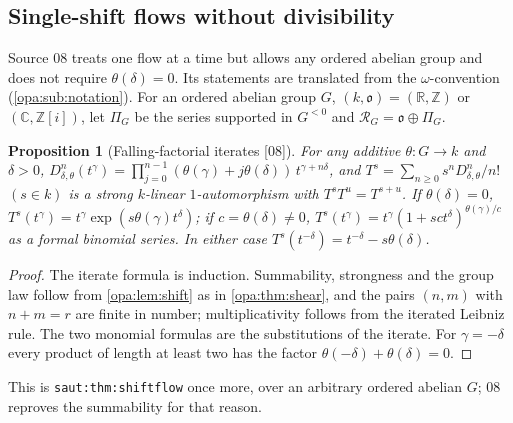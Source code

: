 \documentclass[11pt,oneside]{article}
\numberwithin{equation}{section}
\newtheorem{proposition}[proposition]{Proposition}
\theoremstyle{definition}
\theoremstyle{remark}
\newcommand{\R}{\mathbb R}
\newcommand{\C}{\mathbb C}
\newcommand{\Z}{\mathbb Z}
\newcommand{\oo}{\mathfrak o}
\newcommand{\src}[1]{\textup{\textsf{\small[#1]}}}
\newcommand{\lbl}[1]{\nolinkurl{#1}}
\begin{document}
\subsection{Single-shift flows without divisibility}

Source 08 treats one flow at a time but allows any ordered abelian group and
does not require $\theta(\delta)=0$. Its statements are translated from the
$\omega$-convention (\cref{opa:sub:notation}). For an ordered abelian group $G$,
$(k,\oo)=(\R,\Z)$ or $(\C,\Z[i])$, let $\Pi_G$ be the series supported in
$G^{<0}$ and $\mathcal R_G=\oo\oplus\Pi_G$.

\begin{proposition}[Falling-factorial iterates \src{08}]\label{opa:prop:iterate}
For any additive $\theta:G\to k$ and $\delta>0$,
$D_{\delta,\theta}^n(t^\gamma)=\prod_{j=0}^{n-1}(\theta(\gamma)+j\theta(\delta))\,
t^{\gamma+n\delta}$, and $T^s=\sum_{n\ge0}s^nD_{\delta,\theta}^n/n!$ $(s\in k)$ is a
strong $k$-linear $1$-automorphism with $T^sT^u=T^{s+u}$. If $\theta(\delta)=0$,
$T^s(t^\gamma)=t^\gamma\exp(s\theta(\gamma)t^\delta)$; if $c=\theta(\delta)\ne0$,
$T^s(t^\gamma)=t^\gamma(1+sct^\delta)^{\theta(\gamma)/c}$ as a formal binomial
series. In either case $T^s(t^{-\delta})=t^{-\delta}-s\theta(\delta)$.
\end{proposition}
\begin{proof}
The iterate formula is induction. Summability, strongness and the group law
follow from \cref{opa:lem:shift} as in \cref{opa:thm:shear}, and the pairs
$(n,m)$ with $n+m=r$ are finite in number; multiplicativity follows from the
iterated Leibniz rule. The two monomial formulas are the substitutions of the
iterate. For $\gamma=-\delta$ every product of length at least two has the
factor $\theta(-\delta)+\theta(\delta)=0$.
\end{proof}

This is \lbl{saut:thm:shiftflow} once more, over an arbitrary ordered abelian
$G$; 08 reproves the summability for that reason.
\end{document}
